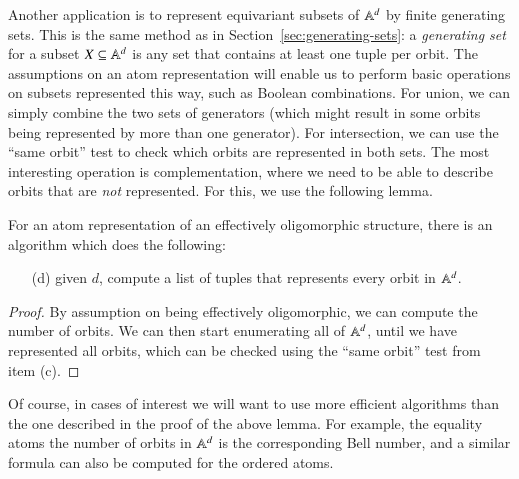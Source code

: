Another application is to represent equivariant subsets of $\mathbb A^d$ by finite generating sets.  
This is the same method as in Section~\ref{sec:generating-sets}: a \emph{generating set} for a subset $X \subseteq \mathbb A^d$ is any set that contains at least one tuple per orbit. The assumptions on an atom representation will enable us to perform basic operations on subsets represented this way, such as Boolean combinations. For union, we can simply combine the two sets of generators (which might result in some orbits being represented by more than one generator). For intersection, we can use the ``same orbit'' test to check which orbits are represented in both sets. The most interesting operation is complementation, where  we need to be able to describe orbits that are \emph{not} represented. For this, we use the following lemma. 

\begin{lemma}\label{lem:enumerate-all-orbits}
	For an atom representation of an effectively oligomorphic structure, there is an algorithm which does the following:
	\begin{enumerate}
		\item[(d)] given $d$, compute a list of tuples that represents every orbit in $\mathbb A^d$. 
	\end{enumerate}
\end{lemma}
\begin{proof}
	By assumption on being effectively oligomorphic, we can compute the number of orbits. We can then start enumerating all of $\mathbb A^d$, until we have represented all orbits, which can be checked using the ``same orbit'' test from item (c).
\end{proof}

Of course, in cases of interest we will want to use more efficient algorithms than the one described in the proof of the above lemma. For example, the equality atoms the number of orbits in $\mathbb A^d$ is the corresponding Bell number, and a  similar formula can also be computed for the ordered atoms. 

\exercisepart
{}





